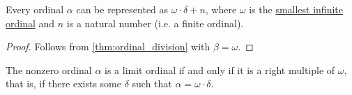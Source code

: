 \begin{corollary}\label{thm:ordinal_division_omega}
  Every ordinal \( \alpha \) can be represented as \( \omega \cdot \delta + n \), where \( \omega \) is the \hyperref[thm:omega_is_an_ordinal]{smallest infinite ordinal} and \( n \) is a natural number (i.e. a finite ordinal).
\end{corollary}
\begin{proof}
  Follows from \cref{thm:ordinal_division} with \( \beta = \omega \).
\end{proof}

\begin{proposition}\label{thm:limit_ordinal_division_characterization}
  The nonzero ordinal \( \alpha \) is a limit ordinal if and only if it is a right multiple of \( \omega \), that is, if there exists some \( \delta \) such that \( \alpha = \omega \cdot \delta \).
\end{proposition}
